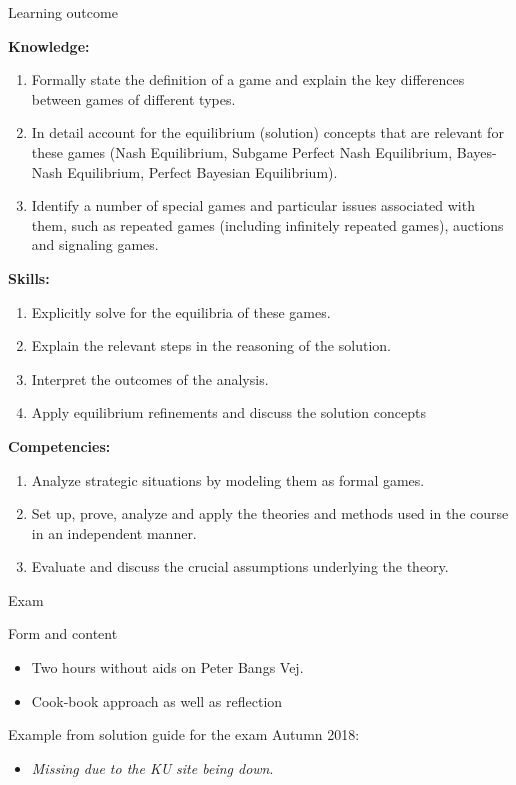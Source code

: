\begin{frame}{Learning outcome}
\begin{multicols}{2}
  \textbf{Knowledge:}
  \begin{enumerate}
    \item Formally state the definition of a game and explain the key differences between games of different types.
    \item In detail account for the equilibrium (solution) concepts that are relevant for these games (Nash Equilibrium, Subgame Perfect Nash Equilibrium, Bayes-Nash Equilibrium, Perfect Bayesian Equilibrium).
    \item Identify a number of special games and particular issues associated with them, such as repeated games (including infinitely repeated games), auctions and signaling games.
  \end{enumerate}
\columnbreak
\textbf{Skills:}
\begin{enumerate}
  \item Explicitly solve for the equilibria of these games.
  \item Explain the relevant steps in the reasoning of the solution.
  \item Interpret the outcomes of the analysis.
  \item Apply equilibrium refinements and discuss the solution concepts
\end{enumerate}
\textbf{Competencies:}
\begin{enumerate}
  \item Analyze strategic situations by modeling them as formal games.
  \item Set up, prove, analyze and apply the theories and methods used in the course in an independent manner.
  \item Evaluate and discuss the crucial assumptions underlying the theory.
\end{enumerate}
\end{multicols}
\end{frame}


\begin{frame}{Exam}
\begin{multicols}{2}
Form and content
\begin{itemize}
  \item Two hours without aids on Peter Bangs Vej.
  \item Cook-book approach as well as reflection
\end{itemize}
\columnbreak
Example from solution guide for the exam Autumn 2018:
\begin{itemize}
  \item \textit{Missing due to the KU site being down}.
\end{itemize}
\end{multicols}
\end{frame}

